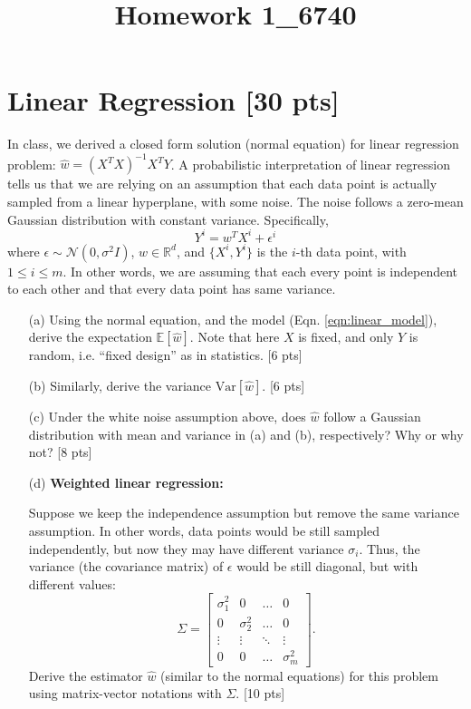 \documentclass[12pt]{article}
\title{Homework 1_6740}
\begin{document}
\MakeScribeTop


\section{Linear Regression [30 pts]}

In class, we derived a closed form solution (normal equation) for
linear regression problem: $\hat{w} = (X^T X)^{-1} X^T Y$. A
probabilistic interpretation of linear regression tells us that we
are relying on an assumption that each data point is actually
sampled from a linear hyperplane, with some noise. The noise
follows a zero-mean Gaussian distribution with constant variance.
Specifically,
\begin{equation}
Y^i = w^T X^i + \epsilon^i
\label{eqn:linear_model}
\end{equation}
where $\epsilon \sim \mathcal{N}(0, \sigma^2 I)$, $w \in \mathbb{R}^d$, and $\{X^i, Y^i\}$ is the $i$-th data point, with $1\leq i\leq m$. In other words,
we are assuming that each every point is independent to each other
and that every data point has same variance.
\begin{itemize}
	\item[(a)] Using the normal equation, and the model (Eqn. \ref{eqn:linear_model}), derive the expectation
$\mathbb{E}[\hat{w}]$. Note that here $X$ is fixed, and only $Y$ is random, i.e. ``fixed design'' as in statistics. [6 pts]
\item[(b)] Similarly, derive the variance $\text{Var}[\hat{w}]$. [6 pts]

\item[(c)] Under the white noise assumption above, does $\hat{w}$ follow a Gaussian
distribution with mean and variance in (a) and (b), respectively? Why or why not? [8 pts]

\item[(d)] \textbf{Weighted linear regression:}

Suppose we keep the independence assumption but
remove the same variance assumption. In other words, data points would be
still sampled independently, but now they may have different
variance $\sigma_i$. Thus, the variance (the covariance matrix) of $\epsilon$ would be still
diagonal, but with different values:
\begin{equation}
\Sigma = \begin{bmatrix}
\sigma_1^2 & 0 & \dots & 0\\
0 & \sigma_2^2& \dots & 0\\
\vdots & \vdots & \ddots & \vdots\\
0 & 0 & \dots & \sigma_m^2
\end{bmatrix}.
\end{equation}
Derive the estimator $\hat{w}$ (similar to the normal equations) for this problem using matrix-vector
notations with $\Sigma$. [10 pts]



\end{itemize}
\end{document}

